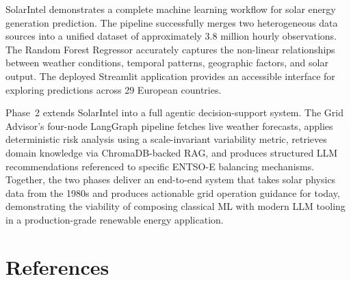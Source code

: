 \documentclass[12pt, a4paper]{article}
\begin{document}
SolarIntel demonstrates a complete machine learning workflow for solar energy generation prediction. The pipeline successfully merges two heterogeneous data sources into a unified dataset of approximately 3.8 million hourly observations. The Random Forest Regressor accurately captures the non-linear relationships between weather conditions, temporal patterns, geographic factors, and solar output. The deployed Streamlit application provides an accessible interface for exploring predictions across 29 European countries.

Phase~2 extends SolarIntel into a full agentic decision-support system. The Grid Advisor's four-node LangGraph pipeline fetches live weather forecasts, applies deterministic risk analysis using a scale-invariant variability metric, retrieves domain knowledge via ChromaDB-backed RAG, and produces structured LLM recommendations referenced to specific ENTSO-E balancing mechanisms. Together, the two phases deliver an end-to-end system that takes solar physics data from the 1980s and produces actionable grid operation guidance for today, demonstrating the viability of composing classical ML with modern LLM tooling in a production-grade renewable energy application.

\newpage
\section*{References}
\end{document}
